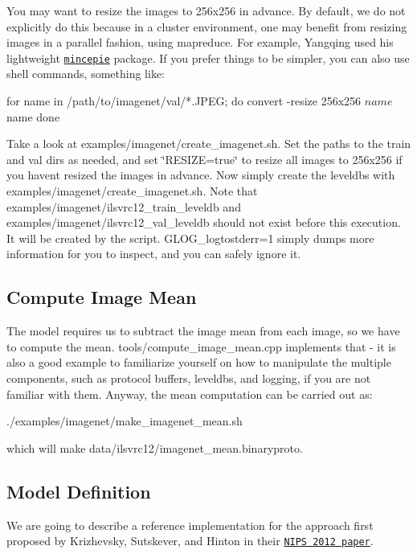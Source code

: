 You may want to resize the images to 256x256 in advance. By default, we do not explicitly do this because in a cluster environment, one may benefit from resizing images in a parallel fashion, using mapreduce. For example, Yangqing used his lightweight \href{https://github.com/Yangqing/mincepie}{\tt mincepie} package. If you prefer things to be simpler, you can also use shell commands, something like\+: \begin{DoxyVerb}for name in /path/to/imagenet/val/*.JPEG; do
    convert -resize 256x256\! $name $name
done
\end{DoxyVerb}


Take a look at {\ttfamily examples/imagenet/create\+\_\+imagenet.\+sh}. Set the paths to the train and val dirs as needed, and set \char`\"{}\+R\+E\+S\+I\+Z\+E=true\char`\"{} to resize all images to 256x256 if you haven\textquotesingle{}t resized the images in advance. Now simply create the leveldbs with {\ttfamily examples/imagenet/create\+\_\+imagenet.\+sh}. Note that {\ttfamily examples/imagenet/ilsvrc12\+\_\+train\+\_\+leveldb} and {\ttfamily examples/imagenet/ilsvrc12\+\_\+val\+\_\+leveldb} should not exist before this execution. It will be created by the script. {\ttfamily G\+L\+O\+G\+\_\+logtostderr=1} simply dumps more information for you to inspect, and you can safely ignore it.

\subsection*{Compute Image Mean }

The model requires us to subtract the image mean from each image, so we have to compute the mean. {\ttfamily tools/compute\+\_\+image\+\_\+mean.\+cpp} implements that -\/ it is also a good example to familiarize yourself on how to manipulate the multiple components, such as protocol buffers, leveldbs, and logging, if you are not familiar with them. Anyway, the mean computation can be carried out as\+: \begin{DoxyVerb}./examples/imagenet/make_imagenet_mean.sh
\end{DoxyVerb}


which will make {\ttfamily data/ilsvrc12/imagenet\+\_\+mean.\+binaryproto}.

\subsection*{Model Definition }

We are going to describe a reference implementation for the approach first proposed by Krizhevsky, Sutskever, and Hinton in their \href{http://books.nips.cc/papers/files/nips25/NIPS2012_0534.pdf}{\tt N\+I\+PS 2012 paper}.


